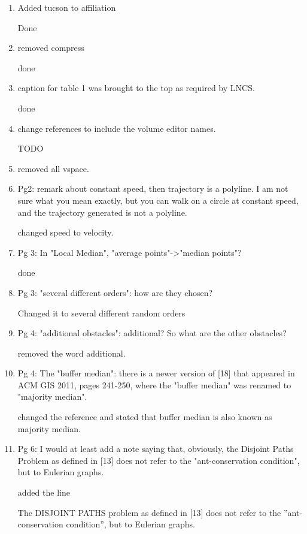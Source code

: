 \documentclass[12pt]{article}
\begin{document}
\begin{enumerate}
\item Added tucson to affiliation
 
Done
\item removed compress

done
\item caption for table 1 was brought to the top as required by LNCS. 

done
\item change references to include the volume editor names.

TODO

\item removed all vspace.


\item Pg2: remark about constant speed, then trajectory is a polyline. I am not sure what you mean exactly, but you can walk on a circle at constant speed, and the trajectory generated is not a polyline.

changed speed to velocity.

\item Pg 3: In "Local Median", "average points"->"median points"?

done

\item Pg 3: "several different orders": how are they chosen?

Changed it to several different random orders

\item Pg 4: "additional obstacles": additional? So what are the other obstacles?

removed the word additional.

\item Pg 4: The "buffer median": there is a newer version of [18] that appeared in ACM GIS 2011, pages 241-250, where the "buffer median" was renamed to "majority median".

changed the reference and stated that buffer median is also known as majority median.

\item { Pg 6: I would at least add a note saying that, obviously, the Disjoint Paths Problem as defined in [13] does not refer to the "ant-conservation condition", but to Eulerian graphs.
}

added the line 

The
DISJOINT PATHS problem as defined in [13] does not refer to the ”ant-conservation
condition”, but to Eulerian graphs.


\end{enumerate}
\end{document}
